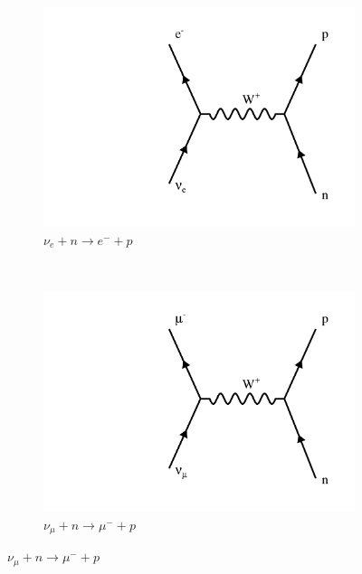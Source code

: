 \begin{figure}
\begin{center}
  \begin{subfigure}[b]{0.45\textwidth}
    \centering
    \includegraphics[width=\textwidth]{figures/feynman/ccNue.pdf}
    \caption*{$\nu_e + n \rightarrow e^- + p$}
     \label{ncHad}
  \end{subfigure}
  ~
  \begin{subfigure}[b]{0.45\textwidth}
    \centering
    \includegraphics[width=\textwidth]{figures/feynman/ccNumu.pdf}
    \caption*{$\nu_\mu + n \rightarrow \mu^- + p$}
    \label{ccNumu}
  \end{subfigure}


\end{center}
\end{figure}
